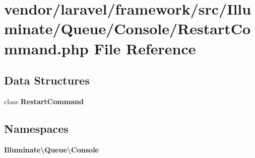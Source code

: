 \section{vendor/laravel/framework/src/\+Illuminate/\+Queue/\+Console/\+Restart\+Command.php File Reference}
\label{_restart_command_8php}
\subsection*{Data Structures}
\begin{DoxyCompactItemize}
\item 
class {\bf Restart\+Command}
\end{DoxyCompactItemize}
\subsection*{Namespaces}
\begin{DoxyCompactItemize}
\item 
 {\bf Illuminate\textbackslash{}\+Queue\textbackslash{}\+Console}
\end{DoxyCompactItemize}
